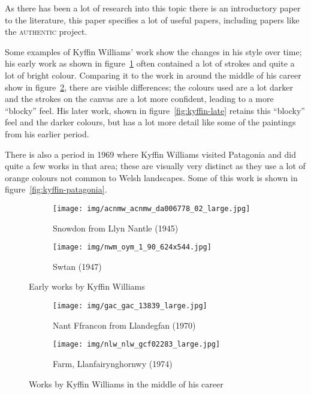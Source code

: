 As there has been a lot of research into this topic there is an introductory paper to the 
literature\cite{Stork2009Computer}, this paper specifies a lot of useful papers, including papers
like the \textsc{authentic} project\cite{Berezhnoy2005Authentic}.

Some examples of Kyffin Williams' work show the changes in his style over time; his early work as
shown in figure~\ref{fig:kyffin-early} often contained a lot of strokes and quite a lot of bright
colour. Comparing it to the work in around the middle of his career show in figure~\ref{fig:kyffin-mid}, there are visible differences;
the colours used are a lot darker and the strokes on the canvas are a lot more confident, leading
to a more ``blocky'' feel. His later work, shown in figure~\ref{fig:kyffin-late} retains this 
``blocky'' feel and the darker colours, but has a lot more detail like some of the paintings from
his earlier period.

There is also a period in 1969 where Kyffin Williams visited Patagonia and did quite a few works
in that area; these are visually very distinct as they use a lot of orange colours not common to
Welsh landscapes. Some of this work is shown in figure~\ref{fig:kyffin-patagonia}.

\begin{figure}[h]
\centering
\begin{subfigure}[b]{0.4\textwidth}
  \centering
  \texttt{[image: img/acnmw\_acnmw\_da006778\_02\_large.jpg]}
  \caption{Snowdon from Llyn Nantle (1945)}
\end{subfigure}
\begin{subfigure}[b]{0.4\textwidth}
  \centering
  \texttt{[image: img/nwm\_oym\_1\_90\_624x544.jpg]}
  \caption{Swtan (1947)}
\end{subfigure}
\caption{Early works by Kyffin Williams}
\label{fig:kyffin-early}
\end{figure}

\begin{figure}[h]
\centering
\begin{subfigure}[b]{0.4\textwidth}
  \centering
  \texttt{[image: img/gac\_gac\_13839\_large.jpg]}
  \caption{Nant Ffrancon from Llandegfan (1970)}
\end{subfigure}
\begin{subfigure}[b]{0.4\textwidth}
  \centering
  \texttt{[image: img/nlw\_nlw\_gcf02283\_large.jpg]}
  \caption{Farm, Llanfairynghornwy (1974)}
\end{subfigure}
\caption{Works by Kyffin Williams in the middle of his career}
\label{fig:kyffin-mid}
\end{figure}

